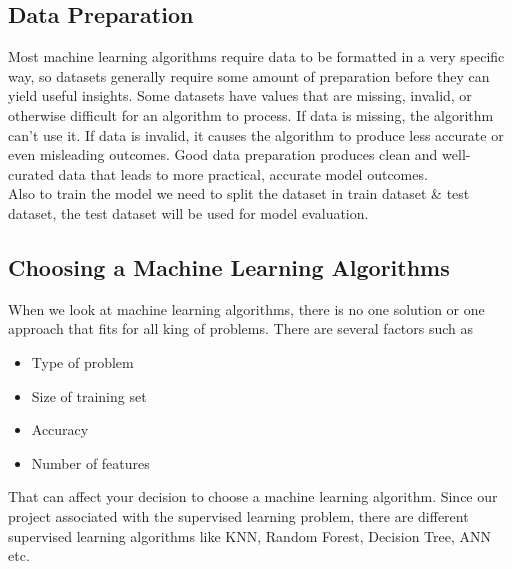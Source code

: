 \subsection{Data Preparation}
Most machine learning algorithms require data to be formatted in a very specific way, so datasets generally require some amount of preparation before they can yield useful insights. Some datasets have values that are missing, invalid, or otherwise difficult for an algorithm to process. If data is missing, the algorithm can’t use it. If data is invalid, it causes the algorithm to produce less accurate or even misleading outcomes. Good data preparation produces clean and well-curated data that leads to more practical, accurate model outcomes. \\ Also to train the model we need to split the dataset in train dataset & test dataset, the test dataset will be used for model evaluation.

\subsection{Choosing a Machine Learning Algorithms}
When we look at machine learning algorithms, there is no one solution or one approach that fits for all king of problems. There are several factors such as 
     \begin{itemize}
         \item {Type of problem}  
         \item {Size of training set}
         \item {Accuracy}
         \item  {Number of features}
     \end{itemize}

That can affect your decision to choose a machine learning algorithm. Since our project associated with the supervised learning problem, there are different supervised learning algorithms like KNN, Random Forest, Decision Tree, ANN etc.



